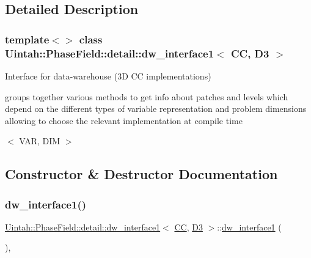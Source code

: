 \subsection{Detailed Description}
\subsubsection*{template$<$$>$\newline
class Uintah\+::\+Phase\+Field\+::detail\+::dw\+\_\+interface1$<$ C\+C, D3 $>$}

Interface for data-\/warehouse (3D CC implementations) 

groups together various methods to get info about patches and levels which depend on the different types of variable representation and problem dimensions allowing to choose the relevant implementation at compile time

$<$ V\+AR, D\+IM $>$ 

\subsection{Constructor \& Destructor Documentation}
\mbox{\label{classUintah_1_1PhaseField_1_1detail_1_1dw__interface1_3_01CC_00_01D3_01_4_aaab27f9f9d153be8d97d003b0b8201d7}} 
\subsubsection{\texorpdfstring{dw\+\_\+interface1()}{dw\_interface1()}\hspace{0.1cm}{\footnotesize\ttfamily [1/2]}}
{\footnotesize\ttfamily \hyperlink{classUintah_1_1PhaseField_1_1detail_1_1dw__interface1}{Uintah\+::\+Phase\+Field\+::detail\+::dw\+\_\+interface1}$<$ \hyperlink{namespaceUintah_1_1PhaseField_a33d355affda78a83f45755ba8388cedda22303704507d024d1d6508ed9859a85a}{CC}, \hyperlink{namespaceUintah_1_1PhaseField_a12bfc68444894dffdf0cb8d9cf0cc76aa72fd61934c7ca788c49ad90629f76e78}{D3} $>$\+::\hyperlink{classUintah_1_1PhaseField_1_1detail_1_1dw__interface1}{dw\+\_\+interface1} (\begin{DoxyParamCaption}{ }\end{DoxyParamCaption})\hspace{0.3cm}{\ttfamily [protected]}, {\ttfamily [delete]}}



